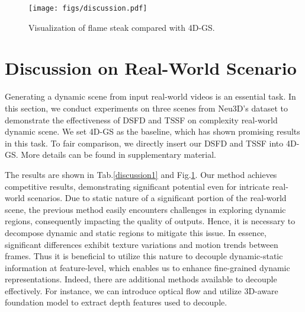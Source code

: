 \begin{figure}[]%
\centering
\texttt{[image: figs/discussion.pdf]}
\caption{Visualization of flame steak compared with 4D-GS.}\label{discussion2}
\end{figure}
\section{Discussion on Real-World Scenario} \label{real-world}
Generating a dynamic scene from input real-world videos is an essential task. In this section, we conduct experiments on three scenes from Neu3D’s dataset to demonstrate the effectiveness of DSFD and TSSF on complexity real-world dynamic scene. We set 4D-GS \cite{wu20244d} as the baseline, which has shown promising results in this task. To fair comparison, we directly insert our DSFD and TSSF into 4D-GS. More details can be found in supplementary material.

\begin{table}[]
	\centering
	\renewcommand\arraystretch{0.95}
	\caption{Evaluation of the performance on Neu3D's dataset.}
\label{discussion1}
\end{table}




The results are shown in Tab.\ref{discussion1} and Fig.\ref{discussion2}. Our method achieves competitive results, demonstrating significant potential even for intricate real-world scenarios. Due to static nature of a significant portion of the real-world scene, the previous method easily encounters challenges in exploring dynamic regions, consequently impacting the quality of outputs. Hence, it is necessary to decompose dynamic and static regions to mitigate this issue. In essence, significant differences exhibit texture variations and motion trends between frames. Thus it is beneficial to utilize this nature to decouple dynamic-static information at feature-level, which enables us to enhance fine-grained dynamic representations. Indeed, there are additional methods available to decouple effectively. For instance, we can introduce optical flow and utilize 3D-aware foundation model \cite{xu2024depthsplat,yang2024depthv2} to extract depth features used to decouple.

